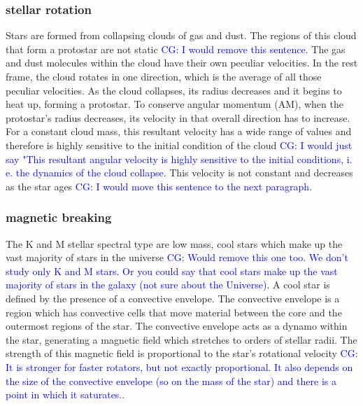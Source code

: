 \documentclass[fleqn,usenatbib]{mnras}
\begin{document}

\subsubsection{stellar rotation }
Stars are formed from collapsing clouds of gas and dust. 
The regions of this cloud that form a protostar are not static \textcolor{blue}{CG: I would remove this sentence}.
The gas and dust molecules within the cloud have their own peculiar velocities.
In the rest frame, the cloud rotates in one direction, which is the average of all those peculiar velocities.
As the cloud collapses, its radius decreases and it begins to heat up, forming a protostar. 
To conserve angular momentum (AM), when the protostar’s radius decreases, its velocity in that overall direction has to increase.
For a constant cloud mass, this resultant velocity has a wide range of values and therefore is highly sensitive to the initial condition of the cloud \textcolor{blue}{CG: I would just say "This resultant angular velocity is highly sensitive to the initial conditions, i. e. the dynamics of the cloud collapse}.
This velocity is not constant and decreases as the star ages \textcolor{blue}{CG: I would move this sentence to the next paragraph}.


\subsubsection{magnetic breaking}
The K and M stellar spectral type are low mass, cool stars which make up the vast majority of stars in the universe \textcolor{blue}{CG: Would remove this one too. We don't study only K and M stars. Or you could say that cool stars make up the vast majority of stars in the galaxy (not sure about the Universe)}. 
A cool star is defined by the presence of a convective envelope.
The convective envelope is a region which has convective cells that move material between the core and the outermost regions of the star. 
The convective envelope acts as a dynamo within the star, generating a magnetic field which stretches to orders of stellar radii. 
The strength of this magnetic field is proportional to the star's rotational velocity  \textcolor{blue}{CG: It is stronger for faster rotators, but not exactly proportional. It also depends on the size of the convective envelope (so on the mass of the star) and there is a point in which it saturates.}.
\end{document}
